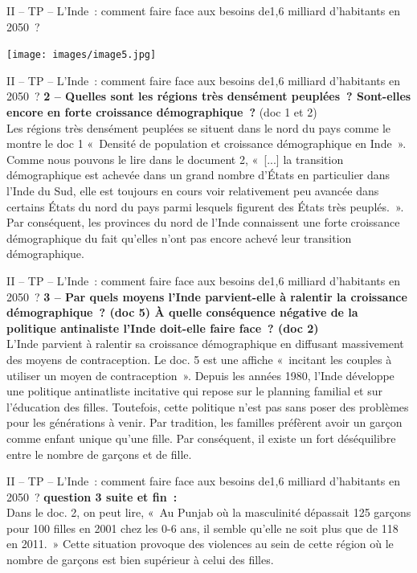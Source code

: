 \documentclass[C]{beamer}
\begin{document}
	\begin{frame}{II -- TP -- L'Inde~: comment faire face aux besoins de1,6 milliard d'habitants en 2050~?}
	\begin{center}
	\texttt{[image: images/image5.jpg]}
	\end{center}
	
	\end{frame}		
	
	\begin{frame}{II -- TP -- L'Inde~: comment faire face aux besoins de1,6 milliard d'habitants en 2050~?}
	\textbf{2 -- Quelles sont les régions très densément peuplées~? Sont-elles encore en forte croissance démographique~?} (doc 1 et 2)\\
\pause
	Les régions très densément peuplées se situent dans le nord du pays comme le montre le doc 1 «~Densité de population et croissance démographique en Inde~». Comme nous pouvons le lire dans le document 2, «~[...] la transition démographique est achevée dans un grand nombre d'\'Etats en particulier dans l'Inde du Sud, elle est toujours en cours voir relativement peu avancée dans certains \'Etats du nord du pays parmi lesquels figurent des \'Etats très peuplés.~». Par conséquent, les provinces du nord de l'Inde connaissent une forte croissance démographique du fait qu'elles n'ont pas encore achevé leur transition démographique.
	\end{frame}
	
	\begin{frame}{II -- TP -- L'Inde~: comment faire face aux besoins de1,6 milliard d'habitants en 2050~?}
	\textbf{3 -- Par quels moyens l'Inde parvient-elle à ralentir la croissance démographique~? (doc 5) \`A quelle conséquence négative de la politique antinaliste l'Inde doit-elle faire face~? (doc 2)}\\
\pause
L'Inde parvient à ralentir sa croissance démographique en diffusant massivement des moyens de contraception. Le doc. 5 est une affiche «~incitant les couples à utiliser un moyen de contraception~». Depuis les années 1980, l'Inde développe une politique antinatliste incitative qui repose sur le planning familial et sur l'éducation des filles. Toutefois, cette politique n'est pas sans poser des problèmes pour les générations à venir. Par tradition, les familles préfèrent avoir un garçon comme enfant unique qu'une fille. Par conséquent, il existe un fort déséquilibre entre le nombre de garçons et de fille. 
	\end{frame}
	
	\begin{frame}{II -- TP -- L'Inde~: comment faire face aux besoins de1,6 milliard d'habitants en 2050~?}
	\textbf{question 3 suite et fin~:}
\\
Dans le doc. 2, on peut lire, «~Au Punjab où la masculinité dépassait 125 garçons pour 100 filles en 2001 chez les 0-6 ans, il semble qu'elle ne soit plus que de 118  en 2011.~» Cette situation provoque des violences au sein de cette région où le nombre de garçons est bien supérieur à celui des filles.
	\end{frame}
	
\end{document}

